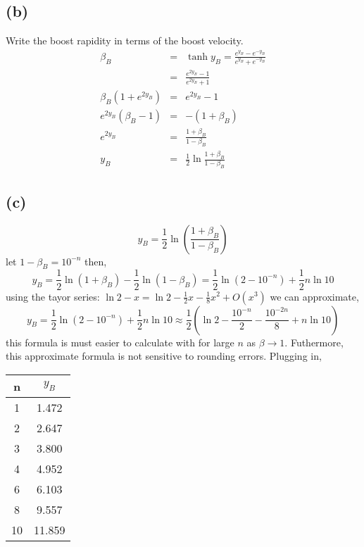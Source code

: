 \documentclass[11pt]{amsart}
\begin{document}
\subsection*{(b)} Write the boost rapidity in terms of the boost velocity. \\
\begin{eqnarray*}
\beta_{B} &=& \tanh{y_{B}} = \frac{e^{y_{B}}-e^{-y_{B}}}{e^{y_{B}}+e^{-y_{B}}} \\
&=& \frac{e^{2y_{B}}-1}{e^{2y_{B}}+1} \\
\beta_{B}(1+e^{2y_{B}}) &=& e^{2y_{B}}-1 \\
e^{2y_{B}}(\beta_{B}-1) &=& -(1+\beta_{B}) \\
e^{2y_{B}} &=& \frac{1+\beta_{B}}{1-\beta_{B}} \\
y_{B} &=& \frac{1}{2}\ln{\frac{1+\beta_{B}}{1-\beta_{B}}} 
\end{eqnarray*}
\subsection*{(c)} 
\[y_B = \frac{1}{2} \ln{\left(\frac{1 + \beta_B}{1 - \beta_B}\right)}\]
let $1 - \beta_B = 10^{-n}$ then, 
\[y_B = \frac{1}{2} \ln{(1 + \beta_B)} - \frac{1}{2} \ln{(1 - \beta_B)} = \frac{1}{2} \ln{(2 - 10^{-n})} +  \frac{1}{2} n \ln{10}\]
using the tayor series: $\ln{2 - x} = \ln{2} - \frac{1}{2} x - \frac{1}{8} x^2 + O(x^3)$ we can approximate,
\[y_B = \frac{1}{2} \ln{(2 - 10^{-n})} +  \frac{1}{2} n \ln{10} \approx \frac{1}{2} \left( \ln{2} - \frac{10^{-n}}{2} - \frac{10^{-2n}}{8} +  n \ln{10} \right)\]
this formula is must easier to calculate with for large $n$ as $\beta \to 1$. Futhermore, this approximate formula is not sensitive to rounding errors. Plugging in, \\ \begin{center}
\begin{tabular}{c | c}
n & $y_B$ \\
\hline
1 & 1.472 \\
2 & 2.647 \\
3 & 3.800 \\
4 & 4.952 \\
6 & 6.103 \\
8 & 9.557 \\
10 & 11.859
\end{tabular}
\end{center}
\end{document}
